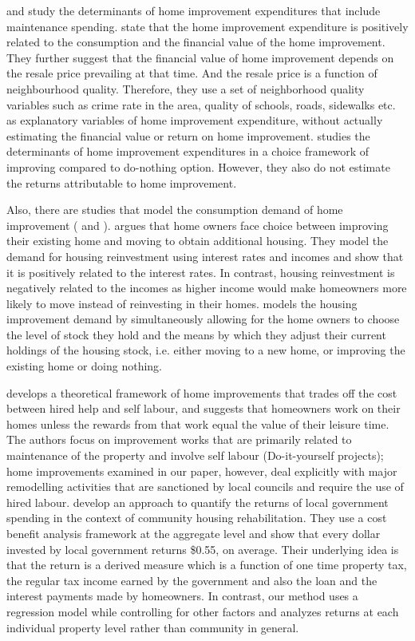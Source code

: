 \documentclass[AEJ,reqno, draftmode]{AEA} %
\begin{document}
\citet{boehm1986improvement} and \citet{galster1987homeowners} study the determinants of home improvement expenditures that include maintenance spending. \citet{boehm1986improvement} state that the home improvement expenditure is positively related to the consumption and the financial value of the home improvement. They further suggest that the financial value of home improvement depends on the resale price prevailing at that time. And the resale price is a function of neighbourhood quality. Therefore, they use a set of neighborhood quality variables such as crime rate in the area, quality of schools, roads, sidewalks etc. as explanatory variables of home improvement expenditure, without actually estimating the financial value or return on home improvement. \citet{galster1987homeowners} studies the determinants of home improvement expenditures in a choice framework of improving compared to do-nothing option. However, they also do not estimate the returns attributable to home improvement.

Also, there are studies that model the consumption demand of home improvement (\citet{potepan1989interest} and \citet{montgomery1992explaining}). \citet{potepan1989interest} argues that home owners face choice between improving their existing home and moving to obtain additional housing. They model the demand for housing reinvestment using interest rates and incomes and show that it is positively related to the interest rates. In contrast, housing reinvestment is negatively related to the incomes as higher income would make homeowners more likely to move instead of reinvesting in their homes. \citet{montgomery1992explaining} models the housing improvement demand by simultaneously allowing for the home owners to choose the level of stock they hold and the means by which they adjust their current holdings of the housing stock, i.e. either moving to a new home, or improving the existing home or doing nothing. 

\citet{mendelsohn1977empirical} develops a theoretical framework of home improvements that trades off the cost between hired help and self labour, and suggests that homeowners work on their homes unless the rewards from that work equal the value of their leisure time. The authors focus on improvement works that are primarily related to maintenance of the property and involve self labour (Do-it-yourself projects); home improvements examined in our paper, however, deal explicitly with major remodelling activities that are sanctioned by local councils and require the use of hired labour. \citet{simons2009housing} develop an approach to quantify the returns of local government spending in the context of community housing rehabilitation. They use a cost benefit analysis framework at the aggregate level and show that every dollar invested by local government returns \$0.55, on average. Their underlying idea is that the return is a derived measure which is a function of one time property tax, the regular tax income earned by the government and also the loan and the interest payments made by homeowners. In contrast, our method uses a regression model while controlling for other factors and analyzes returns at each individual property level rather than community in general.
\end{document}
